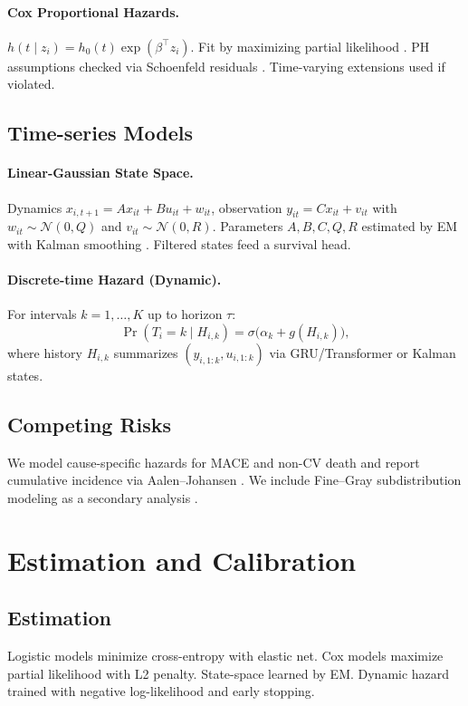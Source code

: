 \documentclass[11pt]{article}
\begin{document}
\paragraph{Cox Proportional Hazards.} \(h(t\mid z_i)=h_0(t)\exp(\beta^\top z_i)\). Fit by maximizing partial likelihood \cite{Cox1972}. PH assumptions checked via Schoenfeld residuals \cite{Schoenfeld1982}. Time-varying extensions used if violated.

\subsection{Time-series Models}
\paragraph{Linear-Gaussian State Space.} Dynamics \(x_{i,t+1}=A x_{it}+B u_{it}+w_{it}\), observation \(y_{it}=C x_{it}+v_{it}\) with \(w_{it}\sim\mathcal N(0,Q)\) and \(v_{it}\sim\mathcal N(0,R)\). Parameters \(A,B,C,Q,R\) estimated by EM with Kalman smoothing \cite{ShumwayStoffer1982}. Filtered states feed a survival head.

\paragraph{Discrete-time Hazard (Dynamic).} For intervals \(k=1,\dots,K\) up to horizon \(\tau\):
\[\Pr(T_i=k\mid H_{i,k})=\sigma\big(\alpha_k+g(H_{i,k})\big),\]
where history \(H_{i,k}\) summarizes \((y_{i,1:k},u_{i,1:k})\) via GRU/Transformer or Kalman states.

\subsection{Competing Risks}
We model cause-specific hazards for MACE and non-CV death and report cumulative incidence via Aalen--Johansen \cite{AalenJohansen1978}. We include Fine--Gray subdistribution modeling as a secondary analysis \cite{FineGray1999}.

\section{Estimation and Calibration}
\subsection{Estimation}
Logistic models minimize cross-entropy with elastic net. Cox models maximize partial likelihood with L2 penalty. State-space learned by EM. Dynamic hazard trained with negative log-likelihood and early stopping.
\end{document}
